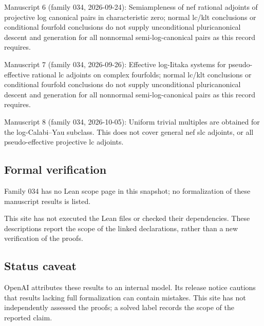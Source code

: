 \documentclass[11pt]{article}
\begin{document}
Manuscript 6 (family 034, 2026-09-24): Semiampleness of nef rational adjoints of projective log canonical pairs in characteristic zero; normal lc/klt conclusions or conditional fourfold conclusions do not supply unconditional pluricanonical descent and generation for all nonnormal semi-log-canonical pairs as this record requires.

Manuscript 7 (family 034, 2026-09-26): Effective log-Iitaka systems for pseudo-effective rational lc adjoints on complex fourfolds; normal lc/klt conclusions or conditional fourfold conclusions do not supply unconditional pluricanonical descent and generation for all nonnormal semi-log-canonical pairs as this record requires.

Manuscript 8 (family 034, 2026-10-05): Uniform trivial multiples are obtained for the log-Calabi–Yau subclass. This does not cover general nef slc adjoints, or all pseudo-effective projective lc adjoints.

\subsection{Formal verification}
Family 034 has no Lean scope page in this snapshot; no formalization of these manuscript results is listed.

This site has not executed the Lean files or checked their dependencies. These descriptions report the scope of the linked declarations, rather than a new verification of the proofs.

\subsection{Status caveat}
OpenAI attributes these results to an internal model. Its release notice cautions that results lacking full formalization can contain mistakes. This site has not independently assessed the proofs; a solved label records the scope of the reported claim.
\end{document}

